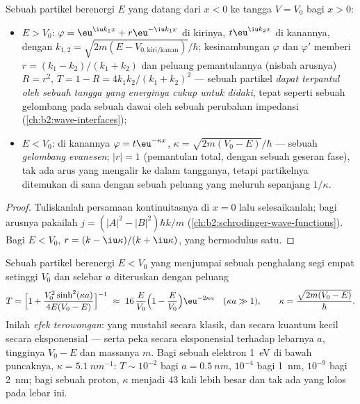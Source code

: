 \begin{proposition}\label{prop:b2:potential-wells-tunneling:step}
Sebuah partikel berenergi $E$ yang datang dari $x < 0$ ke tangga $V = V_0$
bagi $x > 0$:
\begin{itemize}
\item $E > V_0$: $\varphi = \eu^{\iu k_1x} + r\eu^{-\iu k_1x}$ di kirinya, $t\eu^{\iu
      k_2x}$ di kanannya, dengan $k_{1,2} = \sqrt{2m(E - V_{0,\text{kiri/kanan}})}/
      \hbar$; kesinambungan $\varphi$ dan $\varphi'$ memberi $r = (k_1 - k_2)/(k_1
      + k_2)$ dan peluang pemantulannya (nisbah arusnya) $R = r^2$,
      $T = 1 - R = 4k_1k_2/(k_1 + k_2)^2$ --- sebuah partikel \emph{dapat
      terpantul oleh sebuah tangga yang energinya cukup untuk didaki}, tepat seperti sebuah gelombang pada
      sebuah dawai oleh sebuah perubahan impedansi (\cref{ch:b2:wave-interfaces});
\item $E < V_0$: di kanannya $\varphi = t\eu^{-\kappa x}$, $\kappa = \sqrt{2m(V_0
      - E)}/\hbar$ --- sebuah \emph{gelombang evanesen}; $|r| = 1$ (pemantulan total, dengan sebuah geseran fase), tak ada
      arus yang mengalir ke dalam tangganya, tetapi partikelnya ditemukan di sana dengan sebuah
      peluang yang meluruh sepanjang $1/\kappa$.
\end{itemize}
\end{proposition}

\begin{proof}
Tuliskanlah persamaan kontinuitasnya di $x = 0$ lalu selesaikanlah; bagi arusnya
pakailah $j = (|A|^2 - |B|^2)\hbar k/m$ (\cref{ch:b2:schrodinger-wave-functions}).
Bagi $E < V_0$, $r = (k - \iu\kappa)/(k + \iu\kappa)$, yang bermodulus satu.
\end{proof}

\begin{theorem}\label{thm:b2:potential-wells-tunneling:tunnel}
Sebuah partikel berenergi $E < V_0$ yang menjumpai sebuah penghalang segi empat setinggi
$V_0$ dan selebar $a$ diteruskan dengan peluang
\[
T = \Big[1 + \frac{V_0^2\sinh^2(\kappa a)}{4E(V_0 - E)}\Big]^{-1}
\ \approx\ 16\,\frac{E}{V_0}\Big(1 - \frac{E}{V_0}\Big)\eu^{-2\kappa a}
\quad (\kappa a \gg 1), \qquad
\kappa = \frac{\sqrt{2m(V_0 - E)}}{\hbar} .
\]
Inilah \emph{efek terowongan}: yang mustahil
secara klasik, dan secara kuantum kecil secara eksponensial --- serta
peka secara eksponensial terhadap lebarnya $a$, tingginya $V_0 - E$ dan
massanya $m$. Bagi sebuah elektron \qty{1}{eV} di bawah puncaknya, $\kappa = \qty{5.1}{nm^{-1}}$:
$T \sim 10^{-2}$ bagi $a = \qty{0.5}{nm}$, $10^{-4}$ bagi \qty{1}{nm}, $10^{-9}$ bagi
\qty{2}{nm}; bagi sebuah proton, $\kappa$ menjadi $43$ kali lebih besar dan tak ada yang lolos
pada lebar ini.
\end{theorem}

